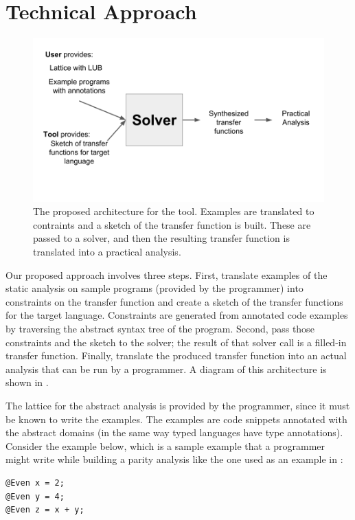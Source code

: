 \documentclass[10pt,conference]{IEEEtran}
\begin{document}
\section{Technical Approach}
\label{sec-tech}

\begin{figure}
 \includegraphics[width=\linewidth]{arch.png}
 \caption{The proposed architecture for the tool.
   Examples are translated to contraints and a sketch of the transfer function is built.
   These are passed to a solver, and then the resulting transfer function is translated into
 a practical analysis.}
\label{fig-arch}
\end{figure} 

Our proposed approach involves three steps.
First, translate examples of the static analysis on sample programs
(provided by the programmer)
into constraints on the transfer function and create
a sketch of the transfer functions for the target language.
Constraints are generated from annotated
code examples by traversing the abstract syntax tree of the
program.
Second, pass those constraints and the sketch to the solver;
the result of that solver call is a filled-in transfer
function. Finally, translate the produced transfer function
into an actual analysis that can be run by a programmer.
A diagram of this architecture is shown in .

The lattice for the abstract analysis is provided by
the programmer, since it must be known to write the examples.
The examples are code snippets annotated with the
abstract domains (in the same way typed languages have type annotations).
Consider the example below, which is a sample example that a
programmer might write while building a parity analysis like the one
used as an example in :

\begin{lstlisting}
@Even x = 2;
@Even y = 4;
@Even z = x + y;
\end{lstlisting}
\end{document}
